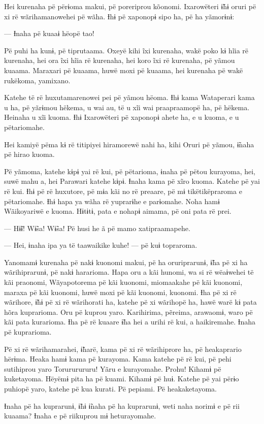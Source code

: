Hei kurenaha pë përɨoma makui, pë poreriprou kõonomi. Ixarowëteri ɨ̃hɨ
oruri pë xi rë wãrihamanowehei pë wãha. Ɨhɨ pë xaponopɨ sipo ha, pë ha
yãmorɨnɨ: 

--- Ɨnaha pë kuaaɨ hëopë tao! 

Pë puhi ha kunɨ, pë tiprutaama. Oxeyë kihi ĩxi kurenaha, wakë poko kɨ
hĩia rë kurenaha, hei ora ĩxi hĩia rë kurenaha, hei koro ĩxi rë
kurenaha, pë yãmou kuaama. Maraxari pë kuaama, huwë moxi pë kuaama, hei
kurenaha pë wakë rukëkoma, yamixano. 

Katehe të rë huxutamarenowei pei pë yãmou hëoma. Ɨhɨ kama Wataperari
kama u ha, pë yãrɨmou hëkema, u wai au, të u xĩi wai praapraamopë ha, pë
hëkema. Heinaha u xĩi kuoma. Ɨhɨ Ixarowëteri pë xaponopɨ ahete ha, e u
kuoma, e u pëtariomahe. 

Hei kamiyë pëma kɨ rë titipiyei hiramorewë nahi ha, kihi Oruri pë yãmou,
ɨ̃naha pë hirao kuoma. 

Pë yãmoma, katehe kɨpɨ yai rë kui, pë pëtarioma, ɨnaha pë pëtou
kurayoma, hei, suwë mahu a, hei Parawari katehe kɨpɨ. Ɨnaha kama pë xĩro
kuoma. Katehe pë yai rë kui. Ɨhɨ pë rë huxutore, pë mɨa kãi no rë
preaare, pë mɨ tikëtikëpraroma e pëtariomahe. Ɨhɨ hapa ya wãha rë
yuprarɨhe e parɨomahe. Noha hamɨ Wãikoyariwë e kuoma. Hɨtɨtɨ, pata e
nohapɨ aimama, pë oni pata rë prei. 

--- Hɨ̃ɨ! Wɨ̃sa! Wɨ̃sa! Pë husi he ã pë mamo xatipraamapehe. 

--- Hei, ɨnaha ipa ya të taawaikike kuhe! --- pë kuɨ topraroma. 

Yanomamɨ kurenaha pë nakɨ kuonomi makui, pë ha oruriprarunɨ, ɨ̃ha pë xi
ha wãrihiprarunɨ, pë nakɨ hararioma. Hapa oru a kãi hunomi, wa si rë
wëaɨwehei të kãi praonomi, Wãyapotorema pë kãi kuonomi, miomaakahe pë
kãi kuonomi, maraxa pë kãi kuonomi, huwë moxi pë kãi kuonomi, kuonomi.
Ɨha pë xi rë wãrihore, ɨ̃hɨ pë xi rë wãrihorati ha, katehe pë xi wãrihopë
ha, hawë warë kɨ pata hõra kuprarioma. Oru pë kuprou yaro. Karihirima,
pẽreima, arawaomɨ, waro pë kãi pata kurarioma. Ɨha pë rë kuaare ɨ̃ha hei
a urihi rë kui, a haikiremahe. Ɨnaha pë kuprarioma. 

Pë xi rë wãrihamarahei, ɨ̃harë, kama pë xi rë wãrihiprore ha, pë
heakaprario hërɨma. Heaka hamɨ kama pë kurayoma. Kama katehe pë rë kui,
pë pehi sutihiprou yaro Torururururu! Yãru e kurayomahe. Prohu! Kihamɨ
pë kuketayoma. Hëyëmɨ pita ha pë kuami. Kihamɨ pë huɨ. Katehe pë yai
përɨo puhiopë yaro, katehe pë kua kurati. Pë pepiami. Pë heakaketayoma. 

Ɨnaha pë ha kuprarunɨ, ɨ̃hɨ ɨ̃naha pë ha kuprarunɨ, weti naha norimɨ e pë
rii kuaama? Ɨnaha e pë riikuprou mɨ heturayomahe. 

